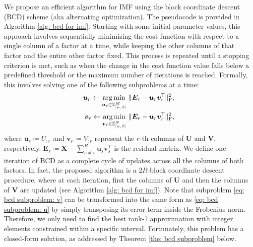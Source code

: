 We propose an efficient algorithm for IMF using the block coordinate descent (BCD) scheme (aka alternating optimization). 
The pseudocode is provided in Algorithm \ref{alg: bcd for imf}.
Starting with some initial parameter values, this approach involves sequentially minimizing the cost function with respect to a single column of a factor at a time, while keeping the other columns of that factor and the entire other factor fixed. This process is repeated until a stopping criterion is met, such as when the change in the cost function value falls below a predefined threshold or the maximum number of iterations is reached. Formally, this involves solving one of the following subproblems at a time:
\begin{align}  
	\bm{u}_r \gets \underset{\bm{u}_r \in \mathbb{Z}_{[\alpha,\beta]}^M}{\operatorname*{arg\,min}} \ \lVert \bm{E}_r - \bm{u}_r \bm{v}_r^\mathsf{T} \rVert_\text{F}^2, \label{eq: bcd subproblem: u} \\
	\bm{v}_r \gets \underset{\bm{v}_r \in \mathbb{Z}_{[\alpha,\beta]}^N}{\operatorname*{arg\,min}} \ \lVert \bm{E}_r - \bm{u}_r \bm{v}_r^\mathsf{T} \rVert_\text{F}^2, \label{eq: bcd subproblem: v}
\end{align}
where $\bm{u}_r \coloneqq U_{:r}$ and $\bm{v}_r \coloneqq V_{:r}$ represent the $r$-th columns of $\bm{U}$ and $\bm{V}$, respectively. $\bm{E}_r \coloneqq \bm{X} - \sum_{s \neq r}^{R} \bm{u}_s \bm{v}_s^\mathsf{T}$ is the residual matrix. We define one iteration of BCD as a complete cycle of updates across all the columns of both factors. In fact, the proposed algorithm is a $2R$-block coordinate descent procedure, where at each iteration, first the columns of $\bm{U}$ and then the columns of $\bm{V}$ are updated (see Algorithm \ref{alg: bcd for imf}). Note that subproblem \eqref{eq: bcd subproblem: v} can be transformed into the same form as \eqref{eq: bcd subproblem: u} by simply transposing its error term inside the Frobenius norm. Therefore, we only need to find the best rank-1 approximation with integer elements constrained within a specific interval. Fortunately, this problem has a closed-form solution, as addressed by Theorem \ref{the: bcd subproblem} below.
\bigskip
